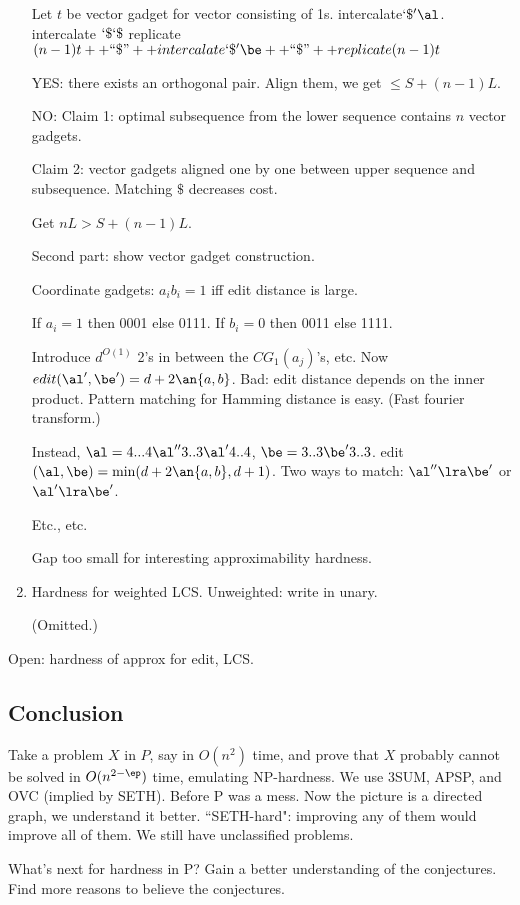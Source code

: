 \begin{enumerate}
Let $t$ be vector gadget for vector consisting of 1s. intercalate$ `\$' \al$. intercalate $`\$` \$$ replicate $(n-1) t ++``\$" ++ intercalate `\$'\be++``\$" ++ replicate (n-1) t$

YES: there exists an orthogonal pair. Align them, we get $\le S+(n-1)L$. 

NO: 
Claim 1: optimal subsequence from the lower sequence contains $n$ vector gadgets. 

Claim 2: vector gadgets aligned one by one between upper sequence and subsequence. Matching $\$$ decreases cost.

Get $nL>S+(n-1)L$.

Second part: show vector gadget construction.

Coordinate gadgets: $a_ib_i=1$ iff edit distance is large.

If $a_i=1$ then 0001 else 0111. If $b_i=0$ then 0011 else 1111.

Introduce $d^{O(1)}$ 2's in between the $CG_1(a_j)$'s, etc.
Now $edit(\al',\be') = d+2\an{a,b}$.
Bad: edit distance depends on the inner product. Pattern matching for Hamming distance is easy. (Fast fourier transform.)

Instead, $\al=4...4\al''3..3\al'4..4$, $\be =3..3\be'3..3$. edit$(\al,\be)=\min(d+2\an{a,b},d+1)$. Two ways to match: $\al''\lra \be'$ or $\al'\lra\be'$.

Etc., etc.

Gap too small for interesting approximability hardness.
\item
Hardness for weighted LCS. Unweighted: write in unary.

(Omitted.)
\end{enumerate}
Open: hardness of approx for edit, LCS.

\subsection{Conclusion}

Take a problem $X$ in $P$, say in $O(n^2)$ time, and prove that $X$ probably cannot be solved in $O(n^{2-\ep})$ time, emulating NP-hardness. We use 3SUM, APSP, and OVC (implied by SETH). Before P was a mess. Now the picture is a directed graph, we understand it better.
``SETH-hard": improving any of them would improve all of them.
We still have unclassified problems.

What's next for hardness in P? Gain a better understanding of the conjectures. Find more reasons to believe the conjectures. 

